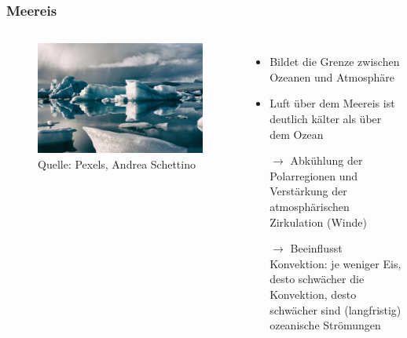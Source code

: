 \begin{frame}
	\frametitle{Meereis} %
  \begin{columns}
    \begin{figure}
      \centering
      \newlength{\imagewidth}
      \includegraphics[trim=0 0 0.69\imagewidth{} 0, clip, width = 0.8\linewidth]{bilder/ice-formation-in-body-of-water-3923277.jpg}
      \caption{Quelle: Pexels, Andrea Schettino}
    \end{figure}
	    \begin{itemize}
		    \item Bildet die Grenze zwischen Ozeanen und Atmosphäre
		    \item Luft über dem Meereis ist deutlich kälter als über dem Ozean
		    \item [$\rightarrow$] Abkühlung der Polarregionen und Verstärkung der atmosphärischen Zirkulation (Winde)
		    \item [$\rightarrow$] Beeinflusst Konvektion: je weniger Eis, desto schwächer die Konvektion, desto schwächer sind (langfristig) ozeanische Strömungen
	   \end{itemize}
   \end{columns}


\end{frame}
